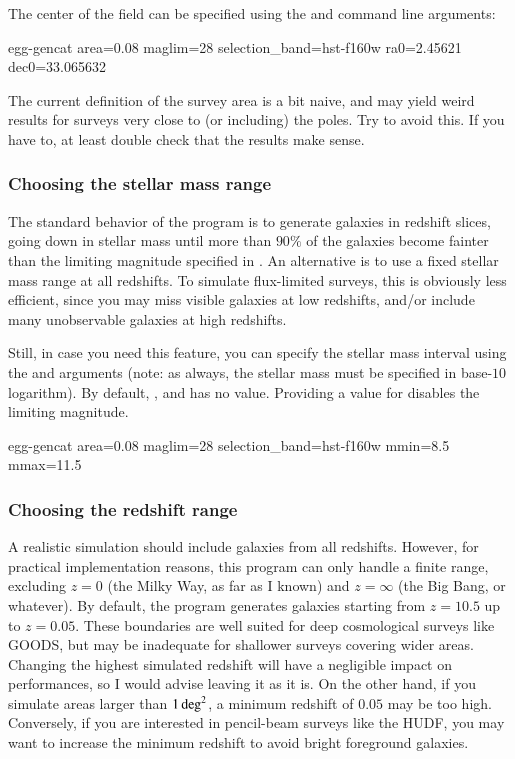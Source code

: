 The center of the field can be specified using the  and  command line arguments:
\begin{bashcode}
egg-gencat area=0.08 maglim=28 selection_band=hst-f160w ra0=2.45621 dec0=33.065632
\end{bashcode}
The current definition of the survey area is a bit naive, and may yield weird results for surveys very close to (or including) the poles. Try to avoid this. If you have to, at least double check that the results make sense.


\subsubsection{Choosing the stellar mass range}

The standard behavior of the program is to generate galaxies in redshift slices, going down in stellar mass until more than $90\%$ of the galaxies become fainter than the limiting magnitude specified in . An alternative is to use a fixed stellar mass range at all redshifts. To simulate flux-limited surveys, this is obviously less efficient, since you may miss visible galaxies at low redshifts, and/or include many unobservable galaxies at high redshifts.

Still, in case you need this feature, you can specify the stellar mass interval using the  and  arguments (note: as always, the stellar mass must be specified in base-$10$ logarithm). By default, , and  has no value. Providing a value for  disables the limiting magnitude.
\begin{bashcode}
egg-gencat area=0.08 maglim=28 selection_band=hst-f160w mmin=8.5 mmax=11.5
\end{bashcode}


\subsubsection{Choosing the redshift range}

A realistic simulation should include galaxies from all redshifts. However, for practical implementation reasons, this program can only handle a finite range, excluding $z=0$ (the Milky Way, as far as I known) and $z=\infty$ (the Big Bang, or whatever). By default, the program generates galaxies starting from $z=10.5$ up to $z=0.05$. These boundaries are well suited for deep cosmological surveys like GOODS, but may be inadequate for shallower surveys covering wider areas. Changing the highest simulated redshift will have a negligible impact on performances, so I would advise leaving it as it is. On the other hand, if you simulate areas larger than $1\,{\rm deg}^2$, a minimum redshift of $0.05$ may be too high. Conversely, if you are interested in pencil-beam surveys like the HUDF, you may want to increase the minimum redshift to avoid bright foreground galaxies.

